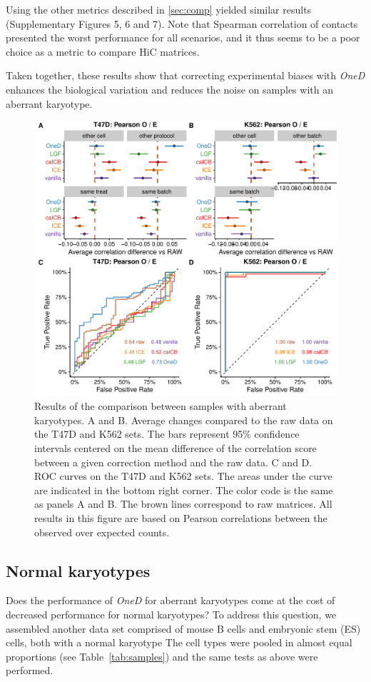 \documentclass{bioinfo}
\begin{document}
Using the other metrics described in \ref{sec:comp} yielded similar
results (Supplementary Figures 5, 6 and 7). Note that Spearman correlation
of contacts presented the worst performance for all scenarios, and it thus
seems to be a poor choice as a metric to compare HiC matrices.

Taken together, these results show that correcting experimental biases
with \textit{OneD} enhances the biological variation and reduces the noise
on samples with an aberrant karyotype.


\begin{figure}
\centerline{\includegraphics[width=.50\textwidth]
  {img/correlation_aberrant_figure3.pdf}}
\caption{
Results of the comparison between samples with aberrant karyotypes. A and
B. Average changes compared to the raw data on the T47D and K562 sets. The
bars represent 95\% confidence intervals centered on the mean difference
of the correlation score between a given correction method and the raw
data. C and D. ROC curves on the T47D and K562 sets.  The areas under the
curve are indicated in the bottom right corner. The color code is the same
as panels A and B. The brown lines correspond to raw matrices. All results
in this figure are based on Pearson correlations between the observed over
expected counts.}
\label{fig:aberrant}
\end{figure}



\subsection{Normal karyotypes}

Does the performance of \textit{OneD} for aberrant karyotypes come at the
cost of decreased performance for normal karyotypes? To address this
question, we assembled another data set comprised of mouse B cells and
embryonic stem (ES) cells, both with a normal karyotype The cell types
were pooled in almost equal proportions (see Table~\ref{tab:samples}) and
the same tests as above were performed.
\end{document}
